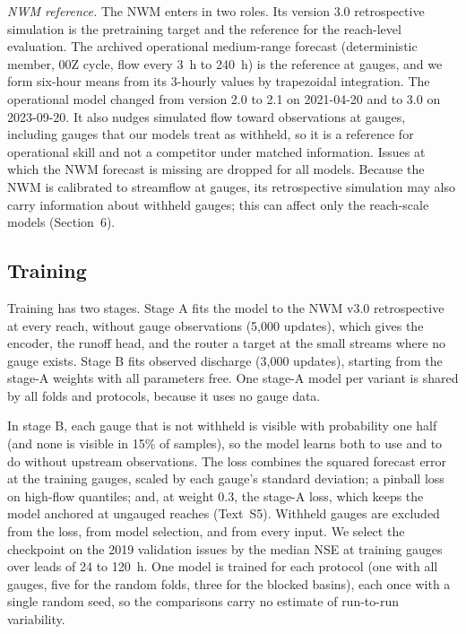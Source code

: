 \documentclass[draft]{agujournal2019}
\begin{document}
\textit{NWM reference.} The NWM enters in two roles. Its version 3.0 retrospective simulation \cite{Cosgrove2024} is the pretraining target and the reference for the reach-level evaluation. The archived operational medium-range forecast (deterministic member, 00Z cycle, flow every 3~h to 240~h) is the reference at gauges, and we form six-hour means from its 3-hourly values by trapezoidal integration. The operational model changed from version 2.0 to 2.1 on 2021-04-20 and to 3.0 on 2023-09-20. It also nudges simulated flow toward observations at gauges, including gauges that our models treat as withheld, so it is a reference for operational skill and not a competitor under matched information. Issues at which the NWM forecast is missing are dropped for all models. Because the NWM is calibrated to streamflow at gauges, its retrospective simulation may also carry information about withheld gauges; this can affect only the reach-scale models (Section~6).

\subsection{Training}
\label{sec:training}

Training has two stages. Stage A fits the model to the NWM v3.0 retrospective at every reach, without gauge observations (5,000 updates), which gives the encoder, the runoff head, and the router a target at the small streams where no gauge exists. Stage B fits observed discharge (3,000 updates), starting from the stage-A weights with all parameters free. One stage-A model per variant is shared by all folds and protocols, because it uses no gauge data.

In stage B, each gauge that is not withheld is visible with probability one half (and none is visible in 15\% of samples), so the model learns both to use and to do without upstream observations. The loss combines the squared forecast error at the training gauges, scaled by each gauge's standard deviation; a pinball loss on high-flow quantiles; and, at weight 0.3, the stage-A loss, which keeps the model anchored at ungauged reaches (Text~S5). Withheld gauges are excluded from the loss, from model selection, and from every input. We select the checkpoint on the 2019 validation issues by the median NSE at training gauges over leads of 24 to 120~h. One model is trained for each protocol (one with all gauges, five for the random folds, three for the blocked basins), each once with a single random seed, so the comparisons carry no estimate of run-to-run variability.
\end{document}
